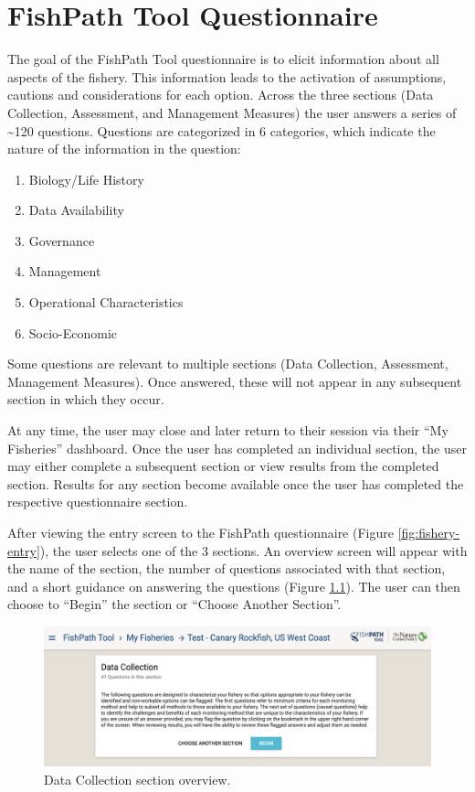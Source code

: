 \documentclass[
  11pt,
]{book}
\providecommand{\tightlist}{%
  \setlength{\itemsep}{0pt}\setlength{\parskip}{0pt}}
\begin{document}
\hypertarget{fishpath-tool-questionnaire}{%
\chapter{FishPath Tool Questionnaire}\label{fishpath-tool-questionnaire}}

The goal of the FishPath Tool questionnaire is to elicit information about all aspects of the fishery. This information leads to the activation of assumptions, cautions and considerations for each option. Across the three sections (Data Collection, Assessment, and Management Measures) the user answers a series of \textasciitilde120 questions. Questions are categorized in 6 categories, which indicate the nature of the information in the question:

\begin{enumerate}
\def\labelenumi{\arabic{enumi}.}
\tightlist
\item
  Biology/Life History
\item
  Data Availability
\item
  Governance
\item
  Management
\item
  Operational Characteristics
\item
  Socio-Economic
\end{enumerate}

Some questions are relevant to multiple sections (Data Collection, Assessment, Management Measures). Once answered, these will not appear in any subsequent section in which they occur.

At any time, the user may close and later return to their session via their ``My Fisheries'' dashboard. Once the user has completed an individual section, the user may either complete a subsequent section or view results from the completed section. Results for any section become available once the user has completed the respective questionnaire section.

After viewing the entry screen to the FishPath questionnaire (Figure \ref{fig:fishery-entry}), the user selects one of the 3 sections. An overview screen will appear with the name of the section, the number of questions associated with that section, and a short guidance on answering the questions (Figure \ref{fig:dc-overview}). The user can then choose to ``Begin'' the section or ``Choose Another Section''.

\begin{figure}

{\centering \includegraphics[width=0.95\linewidth]{images/dc-overview} 

}

\caption{Data Collection section overview.}\label{fig:dc-overview}
\end{figure}
\end{document}

